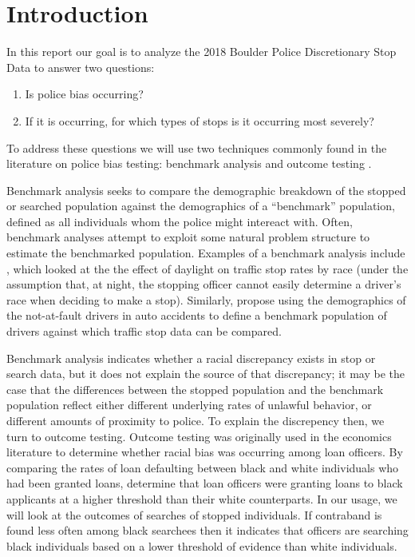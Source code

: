 \documentclass[11pt]{article}
\begin{document}
\section{Introduction}
\label{sec:intro}
In this report our goal is to analyze the 2018 Boulder Police Discretionary Stop Data to answer two questions:
\begin{enumerate}
\item Is police bias occurring?
\item If it is occurring, for which types of stops is it occurring most severely?
\end{enumerate}
To address these questions we will use two techniques commonly found in the literature on police bias testing: benchmark analysis and outcome testing \citep{rice_methods_2010}.

Benchmark analysis seeks to compare the demographic breakdown of the stopped or searched population against the demographics of a ``benchmark'' population, defined as all individuals whom the police might intereact with\cite{engel_comparing_2004}. Often, benchmark analyses attempt to exploit some natural problem structure to estimate the benchmarked population. Examples of a benchmark analysis include \cite{grogger_testing_2006}, which looked at the the effect of daylight on traffic stop rates by race (under the assumption that, at night, the stopping officer cannot easily determine a driver's race when deciding to make a stop). Similarly, \cite{alpert_toward_2004} propose using the demographics of the not-at-fault drivers in auto accidents to define a benchmark population of drivers against which traffic stop data can be compared.

Benchmark analysis indicates whether a racial discrepancy exists in stop or search data, but it does not explain the source of that discrepancy; it may be the case that the differences between the stopped population and the benchmark population reflect either different underlying rates of unlawful behavior, or different amounts of proximity to police. To explain the discrepency then, we turn to outcome testing. Outcome testing was originally used in the economics literature to determine whether racial bias was occurring among loan officers. By comparing the rates of loan defaulting between black and white individuals who had been granted loans, \color{red}{NAME NEEDED} determine that loan officers were granting loans to black applicants at a higher threshold than their white counterparts. In our usage, we will look at the outcomes of searches of stopped individuals. If contraband is found less often among black searchees then it indicates that officers are searching black individuals based on a lower threshold of evidence than white individuals.
\end{document}

